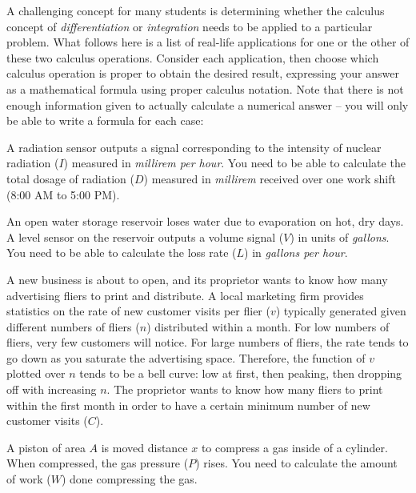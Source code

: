 

A challenging concept for many students is determining whether the calculus concept of {\it differentiation} or {\it integration} needs to be applied to a particular problem.  What follows here is a list of real-life applications for one or the other of these two calculus operations.  Consider each application, then choose which calculus operation is proper to obtain the desired result, expressing your answer as a mathematical formula using proper calculus notation.  Note that there is not enough information given to actually calculate a numerical answer -- you will only be able to write a formula for each case:

\vskip 20pt

A radiation sensor outputs a signal corresponding to the intensity of nuclear radiation ($I$) measured in {\it millirem per hour}.  You need to be able to calculate the total dosage of radiation ($D$) measured in {\it millirem} received over one work shift (8:00 AM to 5:00 PM).

\vskip 20pt

An open water storage reservoir loses water due to evaporation on hot, dry days.  A level sensor on the reservoir outputs a volume signal ($V$) in units of {\it gallons}.  You need to be able to calculate the loss rate ($L$) in {\it gallons per hour}.

\vskip 20pt

A new business is about to open, and its proprietor wants to know how many advertising fliers to print and distribute.  A local marketing firm provides statistics on the rate of new customer visits per flier ($v$) typically generated given different numbers of fliers ($n$) distributed within a month.  For low numbers of fliers, very few customers will notice.  For large numbers of fliers, the rate tends to go down as you saturate the advertising space.  Therefore, the function of $v$ plotted over $n$ tends to be a bell curve: low at first, then peaking, then dropping off with increasing $n$.  The proprietor wants to know how many fliers to print within the first month in order to have a certain minimum number of new customer visits ($C$).

\vskip 20pt

A piston of area $A$ is moved distance $x$ to compress a gas inside of a cylinder.  When compressed, the gas pressure ($P$) rises.  You need to calculate the amount of work ($W$) done compressing the gas.

